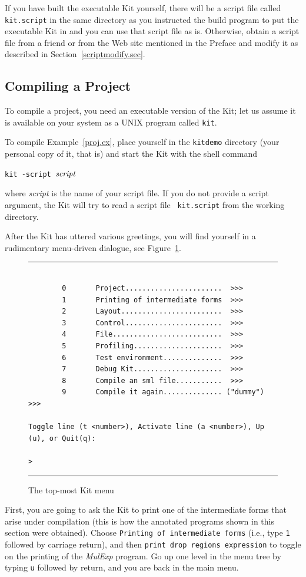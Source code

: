 \documentclass[12pt]{book}
\begin{document}
If you have built the executable Kit yourself, there will be a script
file called {\tt kit.script} in the same directory as you instructed
the build program to put the executable Kit in and you can use that
script file as is. Otherwise, obtain a script file from a friend or
from the Web site mentioned in the Preface and modify it as described
in Section~\ref{scriptmodify.sec}.

\subsection{Compiling a Project}
To compile a project, you need an executable version of the 
Kit; let us assume it is available on your system as a UNIX 
program called {\tt kit}. 


To compile Example~\ref{proj.ex}, place yourself in the {\tt kitdemo}
directory (your personal copy of it, that is) and start the Kit with
the shell command
\begin{tabbing}
\indent\tt kit -script $\hbox{\it script}$
\end{tabbing}
where {\it script} is the name of your script file. If you do not
provide a script argument, the Kit will try to read a script file {\tt
  kit.script} from the working directory.

After the Kit has uttered various greetings, you will 
find yourself in a rudimentary menu-driven dialogue, see
Figure~\ref{dialogue.fig}.
\begin{figure}
\hrule
\begin{verbatim}

        0       Project.......................  >>>
        1       Printing of intermediate forms  >>>
        2       Layout........................  >>>
        3       Control.......................  >>>
        4       File..........................  >>>
        5       Profiling.....................  >>>
        6       Test environment..............  >>>
        7       Debug Kit.....................  >>>
        8       Compile an sml file...........  >>>
        9       Compile it again.............. ("dummy") >>>

Toggle line (t <number>), Activate line (a <number>), Up (u), or Quit(q): 

>
\end{verbatim}
\caption{The top-most Kit menu}
\hrule
\label{dialogue.fig}
\end{figure}
First, you are going to ask the Kit to print one of the intermediate
forms that arise under compilation (this is how the annotated programs
shown in this section were obtained). 
Choose \texttt{Printing of intermediate forms} (i.e., type \texttt{1}
followed by carriage return), and then \texttt{print drop regions
expression} to toggle on the printing of the \emph{MulExp} program.
Go up one level in the menu tree by typing \texttt{u} followed by return,
and you are back in the main menu.
\end{document}
